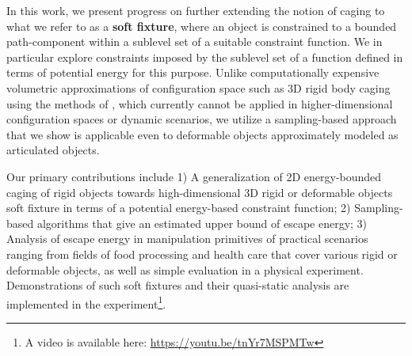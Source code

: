 \documentclass[conference]{IEEEtran}
\begin{document}
In this work, we present progress on further extending the notion of caging to what we refer to as a \textbf{soft fixture}, where an object is constrained to a bounded path-component within a sublevel set of a suitable constraint function.
We in particular explore constraints imposed by the sublevel set of a function defined in terms of potential energy for this purpose. 
Unlike computationally expensive volumetric approximations of configuration space such as 3D rigid body caging using the methods of \cite{x1}, which currently cannot be applied in higher-dimensional configuration spaces or dynamic scenarios, we utilize a sampling-based approach that we show is applicable even to deformable objects approximately modeled as articulated objects.

Our primary contributions include 1) A generalization of 2D energy-bounded caging of rigid objects towards high-dimensional 3D rigid or deformable objects soft fixture in terms of a potential energy-based constraint function; 
2) Sampling-based algorithms that give an estimated upper bound of escape energy; 
3) Analysis of escape energy in manipulation primitives of practical scenarios ranging from fields of food processing and health care that cover various rigid or deformable objects, as well as simple evaluation in a physical experiment.
Demonstrations of such soft fixtures and their quasi-static analysis are implemented in the experiment\footnote{A video is available here: \url{https://youtu.be/tnYr7MSPMTw}}.

\end{document}
